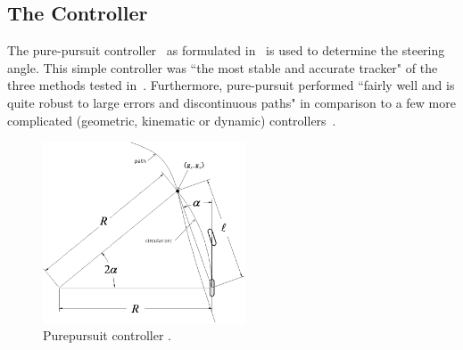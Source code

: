 \subsection{The Controller}
\label{sec:ppcontroller}
The pure-pursuit controller~\cite{Amidi.1991}
as formulated in~\cite{Snider.2009} is used to determine the steering angle.
This simple controller was ``the most stable and accurate tracker"
of the three methods tested in~\cite{Amidi.1991}.
Furthermore, pure-pursuit performed
``fairly well and is quite robust to large errors and discontinuous paths" in comparison to a few more complicated (geometric, kinematic or dynamic) controllers~\cite{Snider.2009}.



\begin{figure}
\centering
\includegraphics[width=60mm]{Figures/Purepursuit.png}%
\caption{Purepursuit controller \cite{Snider.2009}.}
\label{fig:purepursuit}%
\end{figure}

